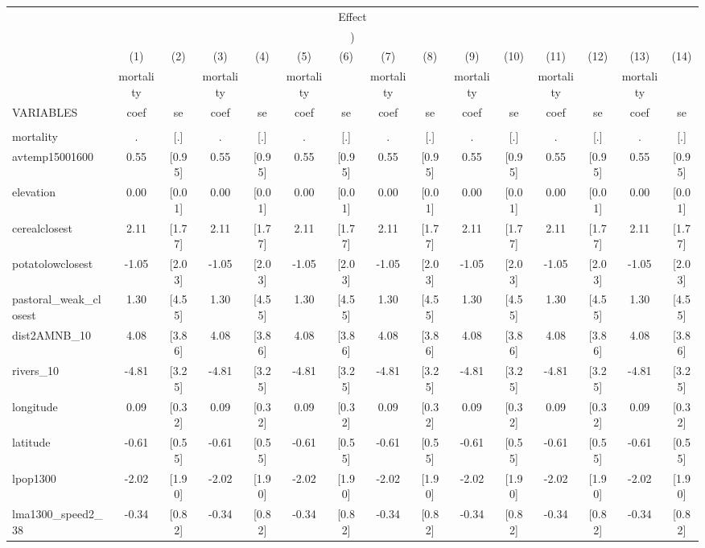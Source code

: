 \documentclass[landscape]{article}
\begin{document}
\begin{tabular}{lcccccccccccccc}
\multicolumn{15}{c}{Effect} \\
\multicolumn{15}{c}{)} \\ \hline
 & (1) & (2) & (3) & (4) & (5) & (6) & (7) & (8) & (9) & (10) & (11) & (12) & (13) & (14) \\
 & mortality &  & mortality &  & mortality &  & mortality &  & mortality &  & mortality &  & mortality &  \\
VARIABLES & coef & se & coef & se & coef & se & coef & se & coef & se & coef & se & coef & se \\ \hline
 &  &  &  &  &  &  &  &  &  &  &  &  &  &  \\
mortality & . & [.] & . & [.] & . & [.] & . & [.] & . & [.] & . & [.] & . & [.] \\
avtemp15001600 & 0.55 & [0.95] & 0.55 & [0.95] & 0.55 & [0.95] & 0.55 & [0.95] & 0.55 & [0.95] & 0.55 & [0.95] & 0.55 & [0.95] \\
elevation & 0.00 & [0.01] & 0.00 & [0.01] & 0.00 & [0.01] & 0.00 & [0.01] & 0.00 & [0.01] & 0.00 & [0.01] & 0.00 & [0.01] \\
cerealclosest & 2.11 & [1.77] & 2.11 & [1.77] & 2.11 & [1.77] & 2.11 & [1.77] & 2.11 & [1.77] & 2.11 & [1.77] & 2.11 & [1.77] \\
potatolowclosest & -1.05 & [2.03] & -1.05 & [2.03] & -1.05 & [2.03] & -1.05 & [2.03] & -1.05 & [2.03] & -1.05 & [2.03] & -1.05 & [2.03] \\
pastoral\_weak\_closest & 1.30 & [4.55] & 1.30 & [4.55] & 1.30 & [4.55] & 1.30 & [4.55] & 1.30 & [4.55] & 1.30 & [4.55] & 1.30 & [4.55] \\
dist2AMNB\_10 & 4.08 & [3.86] & 4.08 & [3.86] & 4.08 & [3.86] & 4.08 & [3.86] & 4.08 & [3.86] & 4.08 & [3.86] & 4.08 & [3.86] \\
rivers\_10 & -4.81 & [3.25] & -4.81 & [3.25] & -4.81 & [3.25] & -4.81 & [3.25] & -4.81 & [3.25] & -4.81 & [3.25] & -4.81 & [3.25] \\
longitude & 0.09 & [0.32] & 0.09 & [0.32] & 0.09 & [0.32] & 0.09 & [0.32] & 0.09 & [0.32] & 0.09 & [0.32] & 0.09 & [0.32] \\
latitude & -0.61 & [0.55] & -0.61 & [0.55] & -0.61 & [0.55] & -0.61 & [0.55] & -0.61 & [0.55] & -0.61 & [0.55] & -0.61 & [0.55] \\
lpop1300 & -2.02 & [1.90] & -2.02 & [1.90] & -2.02 & [1.90] & -2.02 & [1.90] & -2.02 & [1.90] & -2.02 & [1.90] & -2.02 & [1.90] \\
lma1300\_speed2\_38 & -0.34 & [0.82] & -0.34 & [0.82] & -0.34 & [0.82] & -0.34 & [0.82] & -0.34 & [0.82] & -0.34 & [0.82] & -0.34 & [0.82] \\

\end{tabular}
\end{document}
